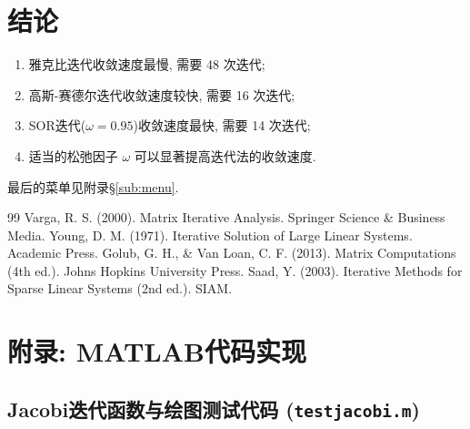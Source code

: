 \documentclass[11pt, a4paper]{article}
\begin{document}
\section{结论}
\begin{enumerate}
    \item 雅克比迭代收敛速度最慢, 需要 48 次迭代;
    \item 高斯-赛德尔迭代收敛速度较快, 需要 16 次迭代;
    \item SOR迭代($\omega = 0.95$)收敛速度最快, 需要 14 次迭代;
    \item 适当的松弛因子 $\omega$ 可以显著提高迭代法的收敛速度.
\end{enumerate}
    最后的菜单见附录\S\ref{sub:menu}. 
\begin{thebibliography}{99}
     Varga, R. S. (2000). Matrix Iterative Analysis. Springer Science \& Business Media.
      Young, D. M. (1971). Iterative Solution of Large Linear Systems. Academic Press.
     Golub, G. H., \& Van Loan, C. F. (2013). Matrix Computations (4th ed.). Johns Hopkins University Press.
     Saad, Y. (2003). Iterative Methods for Sparse Linear Systems (2nd ed.). SIAM.
\end{thebibliography}
\newpage
\appendix
\section{附录: MATLAB代码实现}

\subsection{Jacobi迭代函数与绘图测试代码 (\texttt{testjacobi.m})}
\end{document}
